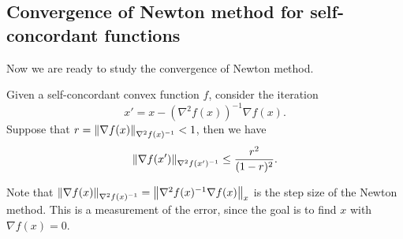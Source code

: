 \subsection{Convergence of Newton method for self-concordant functions}

Now we are ready to study the convergence of Newton method.
\begin{lem}
\label{lem:Newton_improvement}Given a self-concordant convex function
$f$, consider the iteration 
\[
x'=x-(\nabla^{2}f(x))^{-1}\nabla f(x).
\]
Suppose that $r=\left\Vert \nabla f(x)\right\Vert_{\nabla^{2}f(x)^{-1}}<1$, then
we have
\[
\left\Vert \nabla f(x')\right\Vert_{\nabla^{2}f(x')^{-1}}\leq\frac{r^{2}}{(1-r)^{2}}.
\]
\end{lem}

\begin{rem}
Note that $\left\Vert \nabla f(x)\right\Vert_{\nabla^{2}f(x)^{-1}}=\left\Vert \nabla^{2}f(x)^{-1}\nabla f(x)\right\Vert_{x}$
is the step size of the Newton method. This is a measurement of the
error, since the goal is to find $x$ with $\nabla f(x)=0$.
\end{rem}

